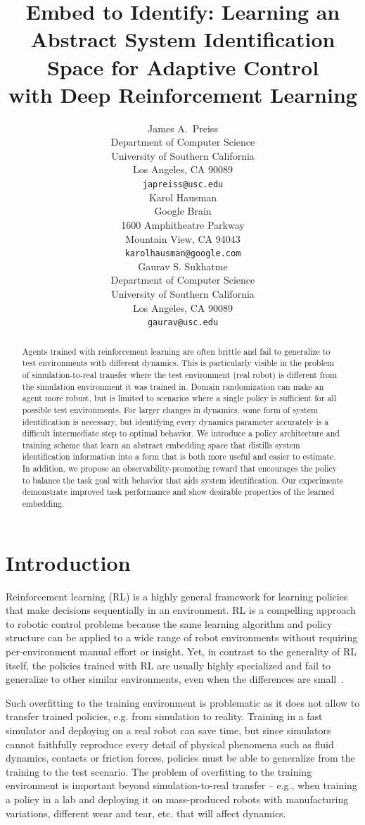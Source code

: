 \documentclass{article}
\title{Embed to Identify: Learning an Abstract System Identification Space for Adaptive Control\\ with Deep Reinforcement Learning}
\author{
  James A.~Preiss \\
  Department of Computer Science\\
  University of Southern California\\
  Los Angeles, CA 90089\\
  \texttt{japreiss@usc.edu} \\
  \AND
  Karol Hausman \\
  Google Brain \\
  1600 Amphitheatre Parkway\\
  Mountain View, CA 94043 \\
  \texttt{karolhausman@google.com} \\
  \And
  Gaurav S. Sukhatme \\
  Department of Computer Science\\
  University of Southern California\\
  Los Angeles, CA 90089\\
  \texttt{gaurav@usc.edu} \\
}
\begin{document}
\maketitle

\begin{abstract}
Agents trained with reinforcement learning are often brittle and fail to generalize to test environments with different dynamics.
This is particularly visible in the problem of simulation-to-real transfer where the test environment (real robot) is different from the simulation environment it was trained in.
Domain randomization can make an agent more robust,
but is limited to scenarios where a single policy is sufficient for all possible test environments.
For larger changes in dynamics, some form of system identification is necessary,
but identifying every dynamics parameter accurately is a difficult intermediate step to optimal behavior.
We introduce a policy architecture and training scheme that learn an abstract embedding space
that distills system identification information into a form that is both more useful and easier to estimate.
In addition, we propose an observability-promoting reward that encourages the policy to balance the task goal with behavior that aids system identification.
Our experiments demonstrate improved task performance and show desirable properties of the learned embedding.
\end{abstract}

\section{Introduction}

Reinforcement learning (RL) is a highly general framework for learning policies that make decisions sequentially in an environment.
RL is a compelling approach to robotic control problems
because the same learning algorithm and policy structure can be applied to a wide range of robot environments
without requiring per-environment manual effort or insight.
Yet, in contrast to the generality of RL itself,
the policies trained with RL are usually highly specialized and fail to generalize to other similar environments,
even when the differences are small~\citep{zhang-study-on-overfitting}.

Such overfitting to the training environment is problematic as it does not allow to transfer trained policies, e.g. from simulation to reality. Training in a fast simulator and deploying on a real robot can save time,
but since simulators cannot faithfully reproduce every detail of physical phenomena such as fluid dynamics, contacts or friction forces, policies must be able to generalize from the training to the test scenario.
The problem of overfitting to the training environment is important beyond simulation-to-real transfer -- e.g., when training a policy in a lab and deploying it on mass-produced robots with manufacturing variations, different wear and tear, etc. that will affect dynamics.
\end{document}
